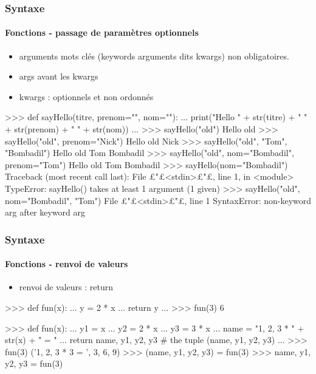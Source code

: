 \begin{frame}[fragile]
\frametitle{Syntaxe}
\framesubtitle{Fonctions - passage de paramètres optionnels}
\begin{itemize}
\item arguments mots clés (keywords arguments dits kwargs) non obligatoires. 
\item args avant les kwargs
\item kwargs : optionnels et non ordonnés
\end{itemize}
\begin{pythonConsole}
>>> def sayHello(titre, prenom="", nom=""): 
...    print("Hello " + str(titre) + " " + str(prenom) + " " + str(nom))
...
>>> sayHello("old")
Hello old
>>> sayHello("old", prenom="Nick")
Hello old Nick
>>> sayHello("old", "Tom", "Bombadil")
Hello old Tom Bombadil
>>> sayHello("old", nom="Bombadil", prenom="Tom")
Hello old Tom Bombadil
>>> sayHello(nom="Bombadil")
Traceback (most recent call last):
  File £"£<stdin>£"£, line 1, in <module>
TypeError: sayHello() takes at least 1 argument (1 given)
>>> sayHello("old", nom="Bombadil", "Tom")
  File £"£<stdin>£"£, line 1
SyntaxError: non-keyword arg after keyword arg
\end{pythonConsole}
\end{frame}
\begin{frame}[fragile]
\frametitle{Syntaxe}
\framesubtitle{Fonctions - renvoi de valeurs}
\begin{itemize}
\item renvoi de valeurs : return
\end{itemize}
\begin{pythonConsole}
>>> def fun(x): 
...    y = 2 * x
...    return y
...
>>> fun(3)
6
\end{pythonConsole}
\begin{pythonConsole}
>>> def fun(x): 
...    y1 = x
...    y2 = 2 * x
...    y3 = 3 * x
...    name = "1, 2, 3 * " + str(x) + " = "
...    return name, y1, y2, y3 # the tuple (name, y1, y2, y3)
...
>>> fun(3)
('1, 2, 3 * 3 = ', 3, 6, 9)
>>> (name, y1, y2, y3) = fun(3)
>>> name, y1, y2, y3 = fun(3)
\end{pythonConsole}
\end{frame}

